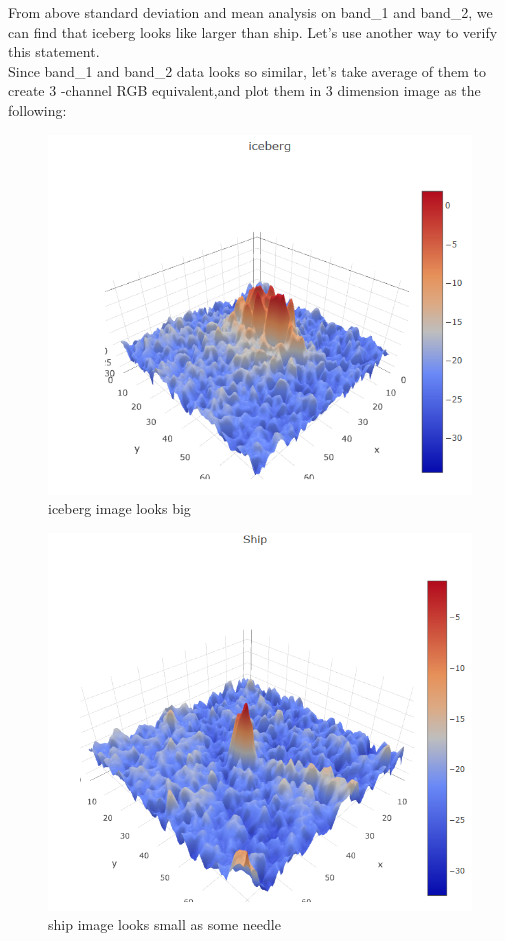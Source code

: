 \documentclass[fleqn,10pt]{SelfArx} %
\begin{document}
From above standard deviation and mean analysis on band\_1 and band\_2, we can find that iceberg looks like larger than ship. Let's use another way to verify this statement.\\
Since band\_1 and band\_2 data looks so similar, let's take average of them to create 3 -channel RGB equivalent,and plot them in 3 dimension image as the following:\\
\begin{figure}[ht]\centering
\includegraphics[width=\linewidth]{3diceberg}
\caption{iceberg image looks big}
\label{fig:3diceberg}
\end{figure}
\begin{figure}[ht]\centering
\includegraphics[width=\linewidth]{3dship}
\caption{ship image looks small as some needle}
\label{fig:3dship}
\end{figure}
\end{document}
